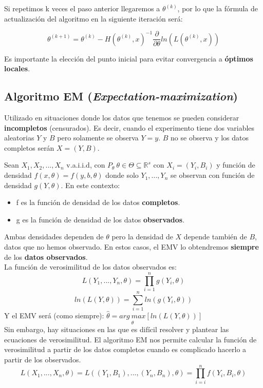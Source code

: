 Si repetimos k veces el paso anterior llegaremos a $\theta^{(k)}$, por lo que la fórmula de actualización del algoritmo en la siguiente iteración será:

$$\theta^{(k+1)}=\theta^{(k)}-H(\theta^{(k)},x)^{-1}\frac{\partial}{\partial\theta}ln(L(\theta^{(k)},x))$$

Es importante la elección del punto inicial para evitar convergencia a \textbf{óptimos locales}.

\newpage
\subsection{Algoritmo EM (\textit{Expectation-maximization})}

Utilizado en situaciones donde los datos que tenemos se pueden considerar \textbf{incompletos} (censurados). 
Es decir, cuando el experimento tiene dos variables aleatorias $Y$ y $B$ pero solamente se observa $Y=y$. $B$ no se observa y los datos completos serán $X=(Y,B)$. 

Sean $X_1, X_2,...,X_n$ v.a.i.i.d, con $P_\theta\ \theta\in\Theta\subseteq \mathbb{R}^s$ con $X_i=(Y_i,B_i)$ y función de densidad $f(x,\theta)=f(y,b,\theta)$ donde solo $Y_1,...,Y_n$ se observan con función de densidad $g(Y,\theta)$.
En este contexto:
\begin{itemize}
    \item f es la función de densidad de los datos \textbf{completos}.
    \item g es la función de densidad de los datos \textbf{observados}.
\end{itemize}
Ambas densidades dependen de $\theta$ pero la densidad de $X$ depende también de $B$, datos que no hemos observado. En estos casos, el EMV lo obtendremos \textbf{siempre} de los \textbf{datos observados}.
\\

La función de verosimilitud de los datos observados es:
$$L(Y_1,...,Y_n,\theta)= \prod_{i=1}^{n}g(Y_i,\theta)$$ $$ln(L(Y,\theta))=\sum_{i=1}^{n}ln(g(Y_i,\theta))$$ Y el EMV será (como siempre): $\widehat\theta=\underset{\theta}{arg\ max}[ln(L(Y,\theta))]$
\\

Sin embargo, hay situaciones en las que es difícil resolver y plantear las ecuaciones de verosimilitud. El algoritmo EM nos permite calcular la función de verosimilitud a partir de los datos completos cuando es complicado hacerlo a partir de los observados.
$$L(X_1,...,X_n,\theta)=L((Y_1,B_1),...,(Y_n,B_n),\theta)=\prod_{i=i}^{n}f(Y_i,B_i,\theta)$$

